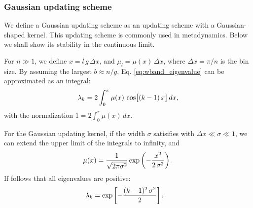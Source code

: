 \documentclass[reprint, floatfix]{revtex4-1}
\begin{document}
\subsubsection{Gaussian updating scheme}



We define a Gaussian updating scheme
as an updating scheme with a
Gaussian-shaped kernel.
%
This updating scheme is commonly
used in metadynamics.
%
Below we shall show its stability
in the continuous limit.



For $n \gg 1$,
we define
$x = l \, g \, \Delta x$,
and
$\mu_l = \mu(x) \, \Delta x$,
where
$\Delta x = \pi/n$
is the bin size.
%
By assuming the largest $b \approx n/g$,
Eq. \eqref{eq:wband_eigenvalue}
can be approximated as an integral:
%
\begin{equation}
  \lambda_k
  =
  2 \int_0^\pi
    \mu(x) \, \cos \bigl[ (k-1) \, x \bigr] \, dx,
\notag
\end{equation}
%
with the normalization
%
$
  1 = 2 \int_0^\pi \mu(x) \, dx.
$


For the Gaussian updating kernel,
if the width $\sigma$ satisifies
with $\Delta x \ll \sigma \ll 1$,
we can extend
the upper limit of the integrals
to infinity, and
%
\begin{equation}
  \mu(x)
  =
  \frac{            1            }
       { \sqrt{ 2 \pi \sigma^2 } }
  \exp\left(
        -\frac{       x^2     }
              { 2 \, \sigma^2 }
      \right)
  .
\notag
\end{equation}
%
%
If follows that all eigenvalues are positive:
%
\begin{align}
  \lambda_k
  &=
  \exp\left[
        -\frac{ (k - 1)^2 \, \sigma^2 }
              {           2           }
      \right]
  .
\notag
\end{align}
\end{document}
